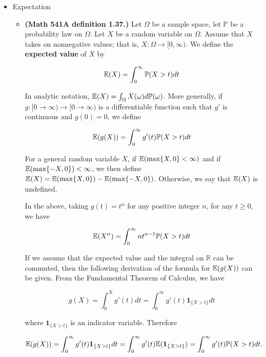\begin{itemize}

\item Expectation

\begin{itemize}

\item \begin{definition}\label{prob.541a.exp.def} \textbf{(Math 541A definition 1.37.)} Let \(\Omega\) be a sample space, let \(\mathbb{P}\) be a probability law on \(\Omega\). Let \(X\) be a random variable on \(\Omega\). Assume that \(X\) takes on nonnegative values; that is, \(X: \Omega \to [0, \infty)\). We define the \textbf{expected value} of \(X\) by

\[
\mathbb{E}(X) = \int_0^\infty \mathbb{P}(X > t) dt
\]

In analytic notation, \(\mathbb{E}(X) = \int_{\Omega} X(\omega) d \mathbb{P}(\omega)\). More generally, if \(g: [0 \to \infty) \to [0 \to \infty)\) is a differentiable function such that \(g'\) is continuous and \(g(0)= 0\), we define

\[
\mathbb{E}(g(X)) = \int_0^\infty g'(t) \mathbb{P}(X > t) dt
\]

For a general random variable \(X\), if \(\mathbb{E}(\max \{X, 0\} < \infty)\) and if \(\mathbb{E}(\max \{-X, 0\}) < \infty\), we then define \(\mathbb{E}(X) = \mathbb{E}(\max \{X,0\}) - \mathbb{E}(\max\{-X,0\})\). Otherwise, we say that \(\mathbb{E}(X)\) is undefined.

\end{definition}

\begin{definition}\label{prob.def.power.exp} In the above, taking \(g(t)= t^n\) for any positive integer \(n\), for any \(t \geq 0\), we have

\[
\mathbb{E}(X^n) = \int_0^\infty nt^{n-1} \mathbb{P}(X > t) dt
\]

\end{definition}

\begin{remark} If we assume that the expected value and the integral on \(\mathbb{R}\) can be commuted, then the following derivation of the formula for \(\mathbb{E}(g(X))\) can be given. From the Fundamental Theorem of Calculus, we have

\[
g(X) = \int_0^X g'(t) dt = \int_0^\infty g'(t) \boldsymbol{1}_{\{X > t\}} dt
\]

where \(\boldsymbol{1}_{\{X > t\}}\) is an indicator variable. Therefore 

\[
\mathbb{E}(g(X)) = \int_0^\infty g'(t) \boldsymbol{1}_{\{X > t\}} dt = \int_0^\infty g'(t) \mathbb{E}(\boldsymbol{1}_{\{X > t\}}) = \int_0^\infty g'(t) \mathbb{P}(X > t) dt.
\]


\end{remark}
\end{itemize}
\end{itemize}
